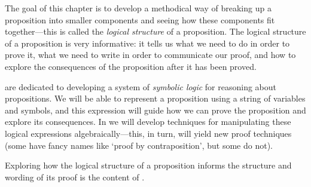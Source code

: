 The goal of this chapter is to develop a methodical way of breaking up a proposition into smaller components and seeing how these components fit together---this is called the \textit{logical structure} of a proposition. The logical structure of a proposition is very informative: it tells us what we need to do in order to prove it, what we need to write in order to communicate our proof, and how to explore the consequences of the proposition after it has been proved.

\begin{center} \vspace{-15pt}
\end{center}

 are dedicated to developing a system of \textit{symbolic logic} for reasoning about propositions. We will be able to represent a proposition using a string of variables and symbols, and this expression will guide how we can prove the proposition and explore its consequences. In  we will develop techniques for manipulating these logical expressions algebraically---this, in turn, will yield new proof techniques (some have fancy names like `proof by contraposition', but some do not).

Exploring how the logical structure of a proposition informs the structure and wording of its proof is the content of .